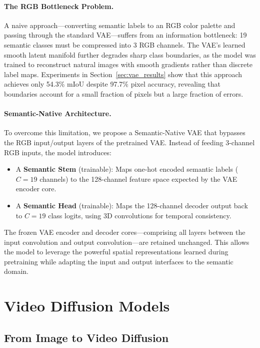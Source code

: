 \paragraph{The RGB Bottleneck Problem.}
A naive approach---converting semantic labels to an RGB color palette and passing through the standard VAE---suffers from an information bottleneck: 19 semantic classes must be compressed into 3 RGB channels. The VAE's learned smooth latent manifold further degrades sharp class boundaries, as the model was trained to reconstruct natural images with smooth gradients rather than discrete label maps. Experiments in Section~\ref{sec:vae_results} show that this approach achieves only 54.3\% mIoU despite 97.7\% pixel accuracy, revealing that boundaries account for a small fraction of pixels but a large fraction of errors.

\paragraph{Semantic-Native Architecture.}
To overcome this limitation, we propose a Semantic-Native VAE that bypasses the RGB input/output layers of the pretrained VAE. Instead of feeding 3-channel RGB inputs, the model introduces:
\begin{itemize}
    \item A \textbf{Semantic Stem} (trainable): Maps one-hot encoded semantic labels ($C=19$ channels) to the 128-channel feature space expected by the VAE encoder core.
    \item A \textbf{Semantic Head} (trainable): Maps the 128-channel decoder output back to $C=19$ class logits, using 3D convolutions for temporal consistency.
\end{itemize}

The frozen VAE encoder and decoder cores---comprising all layers between the input convolution and output convolution---are retained unchanged. This allows the model to leverage the powerful spatial representations learned during pretraining while adapting the input and output interfaces to the semantic domain.

\section{Video Diffusion Models}
\label{sec:video_diffusion}

\subsection{From Image to Video Diffusion}
\label{subsec:image_to_video}

